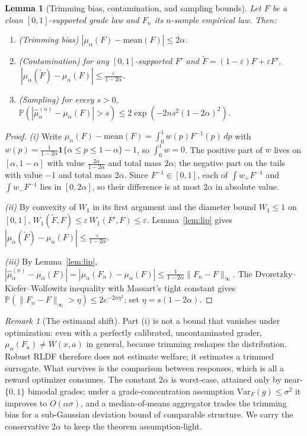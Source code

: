 \documentclass[11pt]{article}
\theoremstyle{plain}
\newtheorem{lemma}{Lemma}
\theoremstyle{definition}
\theoremstyle{remark}
\newtheorem{remark}{Remark}
\newcommand{\Prob}{\mathbb{P}}
\newcommand{\Ind}{\mathbf{1}}
\newcommand{\Wbar}{\overline{W}}
\newcommand{\eps}{\varepsilon}
\begin{document}
\begin{lemma}[Trimming bias, contamination, and sampling bounds]
\label{lem:three}
Let $F$ be a clean $[0,1]$-supported grade law and $F_n$ its $n$-sample empirical law. Then:
\begin{enumerate}[label=\textup{(\roman*)},leftmargin=2.4em,itemsep=2pt,topsep=2pt]
  \item \emph{(Trimming bias)} $|\mu_\alpha(F)-\mathrm{mean}(F)|\le 2\alpha$.
  \item \emph{(Contamination)} for any $[0,1]$-supported $F'$ and
  $\tilde F=(1-\eps)F+\eps F'$, $\ |\mu_\alpha(\tilde F)-\mu_\alpha(F)|\le\frac{\eps}{1-2\alpha}$.
  \item \emph{(Sampling)} for every $s>0$,
  $\Prob(|\hat\mu_\alpha^{(n)}-\mu_\alpha(F)|>s)\le 2\exp(-2ns^2(1-2\alpha)^2)$.
\end{enumerate}
\end{lemma}

\begin{proof}
\emph{(i)} Write $\mu_\alpha(F)-\mathrm{mean}(F)=\int_0^1 w(p)F^{-1}(p)\,dp$ with
$w(p)=\frac{1}{1-2\alpha}\Ind\{\alpha\le p\le1-\alpha\}-1$, so $\int_0^1 w=0$. The positive
part of $w$ lives on $[\alpha,1-\alpha]$ with value $\frac{2\alpha}{1-2\alpha}$ and total mass
$2\alpha$; the negative part on the tails with value $-1$ and total mass $2\alpha$. Since
$F^{-1}\in[0,1]$, each of $\int w_+F^{-1}$ and $\int w_-F^{-1}$ lies in $[0,2\alpha]$, so their
difference is at most $2\alpha$ in absolute value.

\emph{(ii)} By convexity of $W_1$ in its first argument and the diameter bound $W_1\le1$ on
$[0,1]$, $W_1(\tilde F,F)\le\eps\,W_1(F',F)\le\eps$. Lemma~\ref{lem:lip} gives
$|\mu_\alpha(\tilde F)-\mu_\alpha(F)|\le\frac{\eps}{1-2\alpha}$.

\emph{(iii)} By Lemma~\ref{lem:lip},
$|\hat\mu_\alpha^{(n)}-\mu_\alpha(F)|=|\mu_\alpha(F_n)-\mu_\alpha(F)|\le\frac{1}{1-2\alpha}\|F_n-F\|_\infty$.
The Dvoretzky--Kiefer--Wolfowitz inequality with Massart's tight constant \cite{dkw,massart}
gives $\Prob(\|F_n-F\|_\infty>\eta)\le 2e^{-2n\eta^2}$; set $\eta=s(1-2\alpha)$.
\end{proof}

\begin{remark}[The estimand shift]
Part (i) is not a bound that vanishes under optimization: even with a perfectly calibrated, uncontaminated
grader, $\mu_\alpha(F_a)\ne\Wbar(x,a)$ in general, because trimming reshapes the distribution.
Robust RLDF therefore does not estimate welfare; it estimates a trimmed surrogate. What survives
is the comparison between responses, which is all a reward optimizer consumes. The constant
$2\alpha$ is worst-case, attained only by near-$\{0,1\}$ bimodal grades; under a
grade-concentration assumption $\mathrm{Var}_F(g)\le\sigma^2$ it improves to $O(\alpha\sigma)$,
and a median-of-means aggregator \cite{lugosimendelson} trades the trimming bias for a
sub-Gaussian deviation bound of comparable structure. We carry the conservative $2\alpha$ to
keep the theorem assumption-light.
\end{remark}
\end{document}
